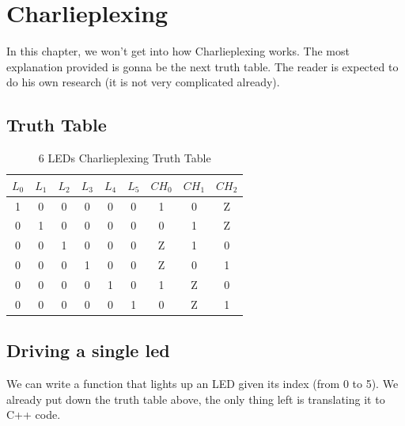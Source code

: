 \documentclass{article}
\begin{document}
\section{Charlieplexing}

In this chapter, we won't get into how Charlieplexing works. The most explanation provided is gonna be the next truth table. The reader is expected to do his own research (it is not very complicated already).

\subsection{Truth Table}

\begin{table}[H]
    \centering
    \begin{tabular}{|c|c|c|c|c|c||c|c|c|} \hline 
         $L_0$&  $L_1$&  $L_2$&  $L_3$&  $L_4$&  $L_5$& $CH_0$&  $CH_1$&  $CH_2$\\ \hline \hline 
         1&  0&  0&  0&  0&  0&  1&  0&  Z\\ \hline
         0&  1&  0&  0&  0&  0&  0&  1&  Z\\ \hline
         0&  0&  1&  0&  0&  0&  Z&  1&  0\\ \hline
         0&  0&  0&  1&  0&  0&  Z&  0&  1\\ \hline
         0&  0&  0&  0&  1&  0&  1&  Z&  0\\ \hline
         0&  0&  0&  0&  0&  1&  0&  Z&  1\\ \hline
    \end{tabular}
    \caption{6 LEDs Charlieplexing Truth Table}
\end{table}

\subsection{Driving a single led}
We can write a function that lights up an LED given its index (from 0 to 5). We already put down the truth table above, the only thing left is translating it to C++ code.
\end{document}
